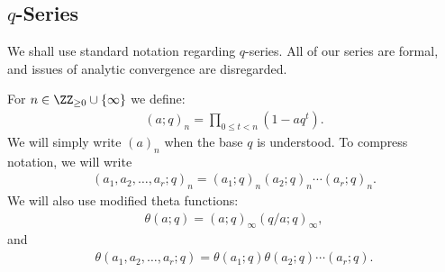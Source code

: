 \subsection{\texorpdfstring{$q$-Series}{q-Series}}
We shall use standard notation regarding $q$-series. 
All of our series are formal, and issues of analytic convergence are disregarded.

For $n\in\ZZ_{\geq 0}\cup\{\infty\}$ we define:
\begin{align}
(a;q)_n=\prod_{0\leq t<n}(1-aq^{t}).
\end{align}
We will simply write $(a)_n$ when the base $q$ is understood.
To compress notation, we will write
\begin{align}
(a_1,a_2,\dots,a_r;q)_n=(a_1;q)_n(a_2;q)_n\cdots(a_r;q)_n.
\end{align}
We will also use modified theta functions:
\begin{align}
\theta(a;q)=(a;q)_\infty(q/a;q)_\infty,
\end{align}
and
\begin{align}
\theta(a_1,a_2,\dots,a_r;q)=\theta(a_1;q)\theta(a_2;q)\cdots(a_r;q).
\end{align}

